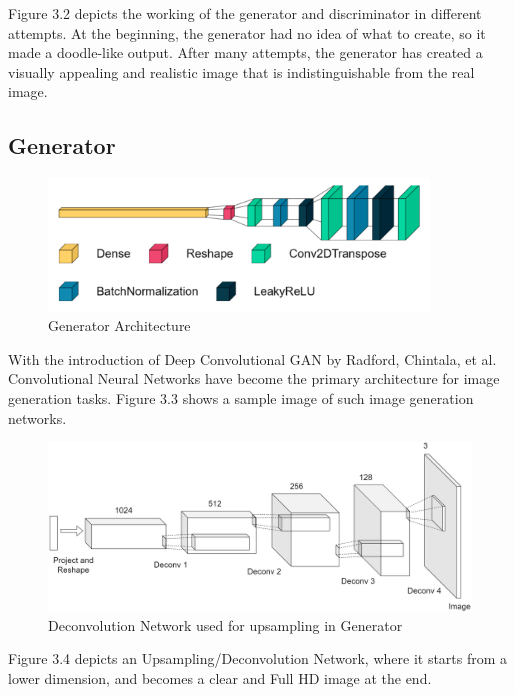 \noindent
Figure 3.2 depicts the working of the generator and discriminator in different attempts. At the beginning, the generator had no idea of what to create, so it made a doodle-like output. After many attempts, the generator has created a visually appealing and realistic image that is indistinguishable from the real image.

\clearpage

\subsection{Generator}

\begin{figure}[h!]
    \centering
    \includegraphics[width=0.9\textwidth]{Images/gen_arch.png}
    \caption{Generator Architecture}
\end{figure}

\noindent 
With the introduction of Deep Convolutional GAN by Radford, Chintala, et al. Convolutional Neural Networks have become the primary architecture for image generation tasks. Figure 3.3 shows a sample image of such image generation networks.

\begin{figure}[h!]
    \centering
    \includegraphics[width=\textwidth]{Images/deconvolution.png}
    \caption{Deconvolution Network used for upsampling in Generator}
\end{figure}

\noindent
Figure 3.4 depicts an Upsampling/Deconvolution Network, where it starts from a lower dimension, and becomes a clear and Full HD image at the end. 

